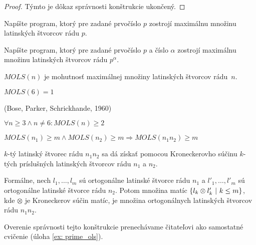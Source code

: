\begin{toreview}
\begin{proof}
Týmto je dôkaz správnosti konštrukcie ukončený.

\end{proof}
\begin{exercise}
Napíšte program, ktorý pre zadané prvočíslo $p$ zostrojí maximálnu množinu latinských štvorcov rádu $p$.
\end{exercise}

\begin{exercise}
Napíšte program, ktorý pre zadané prvočíslo $p$ a číslo $\alpha$ zostrojí maximálnu množinu latinských štvorcov rádu $p^\alpha$.
\end{exercise}
\end{toreview}

\begin{definition}
$MOLS(n)$ je mohutnosť maximálnej množiny latinských štvorcov rádu~$n$.
\end{definition}

\begin{remark}
$MOLS(6) = 1$
\end{remark}

\begin{theorem_hard}{(Bose, Parker, Schrickhande, 1960)}

$\forall n \geq 3 \wedge n \neq 6: MOLS(n) \geq 2$

\end{theorem_hard}

\begin{theorem}
\label{thm:prime_ols}
$MOLS(n_1) \geq m \wedge MOLS(n_2) \geq m \Rightarrow MOLS(n_1 n_2) \geq m$
\end{theorem}

\begin{construction}
$k$-tý latinský štvorec rádu $n_1 n_2$ sa dá získať pomocou Kroneckerovho súčinu $k$-tých príslušných latinských štvorcov rádu $n_1$ a $n_2$.

Formálne, nech $l_1, \ldots, l_m$ sú ortogonálne latinské štvorce rádu $n_1$ a $l'_1, \ldots, l'_m$ sú ortogonálne latinské štvorce rádu $n_2$.
Potom množina matíc $\left\{l_k \otimes l'_k ~|~ k \leq m\right\}$, kde $\otimes$ je Kroneckerov súčin matíc, je množina ortogonálnych latinských štvorcov rádu $n_1 n_2$.

Overenie správnosti tejto konštrukcie prenechávame čitateľovi ako samostatné cvičenie (úloha \ref{ex: prime_ols}).
\end{construction}

